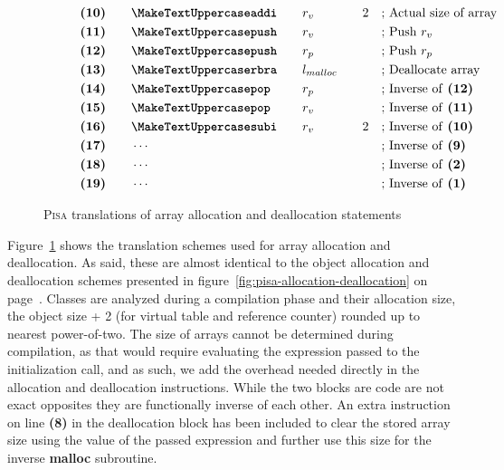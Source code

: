 \begin{figure}[ht]
\begin{subfigure}[t]{0.495\linewidth}
{\begin{minipage}{\linewidth}
\begin{alignat*}{5}
                    &\textbf{(10)}\quad&&\inst{addi}\quad && r_v \quad && 2 &&\text{; Actual size of array}\\
                    &\textbf{(11)}\quad&&\inst{push}\quad && r_v \quad && &&\text{; Push $r_v$}\\
                    &\textbf{(12)}\quad&&\inst{push}\quad && r_p \quad && &&\text{; Push $r_p$}\\
                    &\textbf{(13)}\quad&&\inst{rbra}\quad && l_{malloc} \quad && &&\text{; Deallocate array}\\
                    &\textbf{(14)}\quad&&\inst{pop}\quad && r_p \quad && &&\text{; Inverse of \textbf{(12)}}\\
                    &\textbf{(15)}\quad&&\inst{pop}\quad && r_v \quad && &&\text{; Inverse of \textbf{(11)}}\\
                    &\textbf{(16)}\quad&&\inst{subi}\quad && r_v \quad && 2 &&\text{; Inverse of \textbf{(10)}}\\
                    &\textbf{(17)}\quad&&\cdots\quad &&\quad && &&\text{; Inverse of \textbf{(9)}}\\
                    &\textbf{(18)}\quad&&\cdots\quad && \quad && &&\text{; Inverse of \textbf{(2)}}\\
                    &\textbf{(19)}\quad&&\cdots\quad && \quad && &&\text{; Inverse of \textbf{(1)}}\\
                \end{alignat*}
            \end{minipage}
        }
    \end{subfigure}
    \caption{\textsc{Pisa} translations of array allocation and deallocation statements}
    \label{fig:array-allocation-deallocation}
\end{figure}

Figure~\ref{fig:array-allocation-deallocation} shows the translation schemes used for array allocation and deallocation. As said, these are almost identical to the object allocation and deallocation schemes presented in figure~\ref{fig:pisa-allocation-deallocation} on page~\pageref{fig:pisa-allocation-deallocation}. Classes are analyzed during a compilation phase and their allocation size, the object size + 2 (for virtual table and reference counter) rounded up to nearest power-of-two. The size of arrays cannot be determined during compilation, as that would require evaluating the expression passed to the initialization call, and as such, we add the overhead needed directly in the allocation and deallocation instructions. While the two blocks are code are not exact opposites they are functionally inverse of each other. An extra  instruction on line \textbf{(8)} in the deallocation block has been included to clear the stored array size using the value of the passed expression and further use this size for the inverse \textbf{malloc} subroutine.  

